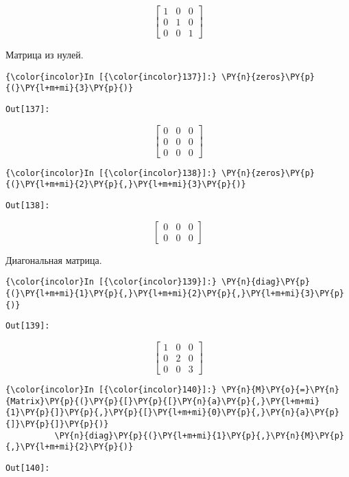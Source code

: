     \[\left[\begin{matrix}1 & 0 & 0\\0 & 1 & 0\\0 & 0 & 1\end{matrix}\right]\]

    

    Матрица из нулей.

    \begin{Verbatim}[commandchars=\\\{\}]
{\color{incolor}In [{\color{incolor}137}]:} \PY{n}{zeros}\PY{p}{(}\PY{l+m+mi}{3}\PY{p}{)}
\end{Verbatim}
\texttt{\color{outcolor}Out[{\color{outcolor}137}]:}
    
    \[\left[\begin{matrix}0 & 0 & 0\\0 & 0 & 0\\0 & 0 & 0\end{matrix}\right]\]

    

    \begin{Verbatim}[commandchars=\\\{\}]
{\color{incolor}In [{\color{incolor}138}]:} \PY{n}{zeros}\PY{p}{(}\PY{l+m+mi}{2}\PY{p}{,}\PY{l+m+mi}{3}\PY{p}{)}
\end{Verbatim}
\texttt{\color{outcolor}Out[{\color{outcolor}138}]:}
    
    \[\left[\begin{matrix}0 & 0 & 0\\0 & 0 & 0\end{matrix}\right]\]

    

    Диагональная матрица.

    \begin{Verbatim}[commandchars=\\\{\}]
{\color{incolor}In [{\color{incolor}139}]:} \PY{n}{diag}\PY{p}{(}\PY{l+m+mi}{1}\PY{p}{,}\PY{l+m+mi}{2}\PY{p}{,}\PY{l+m+mi}{3}\PY{p}{)}
\end{Verbatim}
\texttt{\color{outcolor}Out[{\color{outcolor}139}]:}
    
    \[\left[\begin{matrix}1 & 0 & 0\\0 & 2 & 0\\0 & 0 & 3\end{matrix}\right]\]

    

    \begin{Verbatim}[commandchars=\\\{\}]
{\color{incolor}In [{\color{incolor}140}]:} \PY{n}{M}\PY{o}{=}\PY{n}{Matrix}\PY{p}{(}\PY{p}{[}\PY{p}{[}\PY{n}{a}\PY{p}{,}\PY{l+m+mi}{1}\PY{p}{]}\PY{p}{,}\PY{p}{[}\PY{l+m+mi}{0}\PY{p}{,}\PY{n}{a}\PY{p}{]}\PY{p}{]}\PY{p}{)}
          \PY{n}{diag}\PY{p}{(}\PY{l+m+mi}{1}\PY{p}{,}\PY{n}{M}\PY{p}{,}\PY{l+m+mi}{2}\PY{p}{)}
\end{Verbatim}
\texttt{\color{outcolor}Out[{\color{outcolor}140}]:}
    
